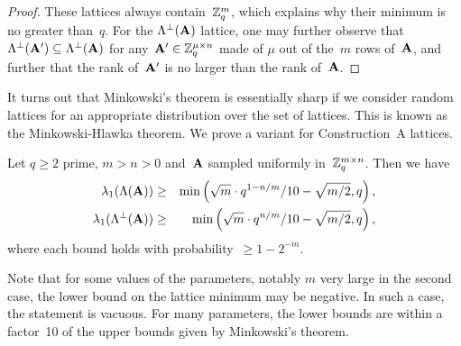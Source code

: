 \begin{proof}
These lattices always contain~$\mathbb{Z}_q^m$, which explains why their minimum is no greater than~$q$. 
For the $\Lambda^{\perp}({\bf A})$ lattice, one may further observe that $\Lambda^{\perp}({\bf A}') \subseteq \Lambda^{\perp}({\bf A})$  for any~${\bf A}' \in \mathbb{Z}_q^{\mu \times n}$ made of $\mu$ out of the~$m$ rows of~${\bf A}$, and further that the rank of~${\bf A}'$ is no larger than the rank of~${\bf A}$. 
\end{proof}

\begin{comment}
2 (1/2sqr(x) q^r/x + sqrt(x)*r*logq*q^r/x*(-1/x^2))
= q^(r/x) x^(-3/2)  ( x - 2r*logq )
=> decreasing up to x = floor (2r log q)
2sqrt(2rlogq) * exp(rlog q / floor (2r log q))
\end{comment}

It turns out that Minkowski's theorem is essentially sharp if we consider random lattices for an appropriate distribution over the 
set of lattices. This is known as the Minkowski-Hlawka theorem. We prove a variant for Construction~A lattices.

\begin{theorem}
\label{thm:Minkowski-Hlawka}
Let $q\geq 2$ prime, $m  > n>0$ and~${\bf A}$ sampled uniformly in~$\mathbb{Z}_q^{m \times n}$. Then we have
\begin{eqnarray*}
            \lambda_1( \Lambda({\bf A})) & \geq  & \min \left(\sqrt{m} \cdot q^{1-n/m}/10 -\sqrt{m/2}, q \right), \\
            \lambda_1( \Lambda^{\perp}({\bf A})) & \geq & \min \left(\sqrt{m} \cdot q^{n/m}/10 -\sqrt{m/2}, q \right),
\end{eqnarray*}
where each bound holds with probability~$\geq 1-2^{-m}$.
\end{theorem}
Note that for some values of the parameters, notably $m$ very large in the second case, 
the lower bound on the lattice minimum may be negative. In such a case, the statement is vacuous. 
For many parameters, the lower bounds are within a factor~10 of the upper bounds given by Minkowski's theorem.

